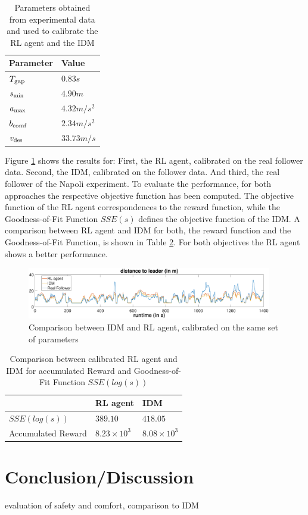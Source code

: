 \documentclass[review]{elsarticle}
\providecommand{\3}{{\ss}}
\begin{document}
\begin{table}
	\caption{Parameters obtained from experimental data and used to calibrate the RL agent and the IDM} 
	\label{tab:IDMparameters} 
	\begin{center}
		\begin{tabular}{ p{} |p{}  } 
		Parameter & Value   \\ \hline
			$T_{\rm gap}$ & $0.83s$\\
			$s_{\rm min}$ & $4.90m$\\
			$a_{\rm max}$ & $4.32m/s^2$\\
			$b_{\rm comf}$ & $2.34 m/s^2$\\
			$v_{\rm des}$ & $33.73m/s$
			
		\end{tabular}
	\end{center}
\end{table}

Figure \ref{fig:IDMvsRL} shows the results for: First, the RL agent, calibrated on the real follower data. Second, the IDM, calibrated on the follower data. And third, the real follower of the Napoli experiment. To evaluate the performance, for both approaches the respective objective function has been computed. The objective function of the RL agent correspondences to the reward function, while the Goodness-of-Fit Function $SSE(s)$ defines the objective function of the IDM. A comparison between RL agent and IDM for both, the reward function and the Goodness-of-Fit Function, is shown in Table \ref{tab:objectiveFunc}. For both objectives the RL agent shows a better performance.

\begin{figure}
	
	\centering
	\includegraphics[width=0.95\textwidth]{images/IDMvsRL_dist}
	\caption{Comparison between IDM and RL agent, calibrated on the same set of parameters}
	\label{fig:IDMvsRL}
\end{figure}

\begin{table}
	\caption{Comparison between calibrated RL agent and IDM for accumulated Reward and Goodness-of-Fit Function $SSE(log(s))$} 
	\label{tab:objectiveFunc} 
	\begin{center}
		\begin{tabular}{p{} | p{} p{}  } 
			& RL agent & IDM   \\ \hline
			$SSE(log(s))$ & $389.10$ &  $418.05$	\\
			Accumulated Reward &  $8.23 \times 10^3$   & $8.08\times 10^3$
			
		\end{tabular}
	\end{center}
\end{table}


\section{Conclusion/Discussion}
evaluation of safety and comfort, comparison to IDM




\end{document}
